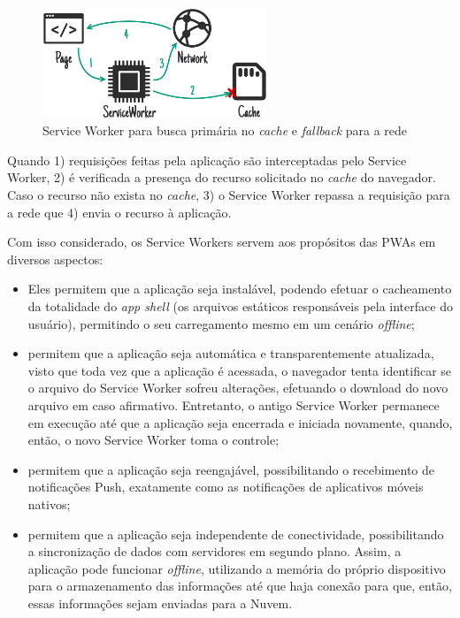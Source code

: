 \documentclass[
	article,			%
	12pt,				%
	oneside,			%
	a4paper,			%
	english,			%
	brazil,				%
	sumario=tradicional
	]{abntex2}
\begin{document}
\begin{figure}[!htb]
	\label{Service Worker}
	\centering
	\caption{Service Worker para busca primária no \textit{cache} e \textit{fallback} para a rede}
	\includegraphics[width=0.6\textwidth]{figures/ss-falling-back-to-network}
\end{figure}

Quando 1) requisições feitas pela aplicação são interceptadas pelo Service Worker, 2) é verificada a presença do recurso solicitado no \textit{cache} do navegador. Caso o recurso não exista no \textit{cache}, 3) o Service Worker repassa a requisição para a rede que 4) envia o recurso à aplicação.

Com isso considerado, os Service Workers servem aos propósitos das PWAs em diversos aspectos:

\begin{itemize}
	\item
	Eles permitem que a aplicação seja instalável, podendo efetuar o cacheamento da totalidade do \textit{app shell} (os arquivos estáticos responsáveis pela interface do usuário), permitindo o seu carregamento mesmo em um cenário \textit{offline};
	\item    
	permitem que a aplicação seja automática e transparentemente atualizada, visto que toda vez que a aplicação é acessada, o navegador tenta identificar se o arquivo do Service Worker sofreu alterações, efetuando o download do novo arquivo em caso afirmativo. Entretanto, o antigo Service Worker permanece em execução até que a aplicação seja encerrada e iniciada novamente, quando, então, o novo Service Worker toma o controle;
	\item
	permitem que a aplicação seja reengajável, possibilitando o recebimento de notificações Push, exatamente como as notificações de aplicativos móveis nativos;
	\item
	permitem que a aplicação seja independente de conectividade, possibilitando a sincronização de dados com servidores em segundo plano. Assim, a aplicação pode funcionar \textit{offline}, utilizando a memória do próprio dispositivo para o armazenamento das informações até que haja conexão para que, então, essas informações sejam enviadas para a Nuvem.
\end{itemize}
\end{document}
